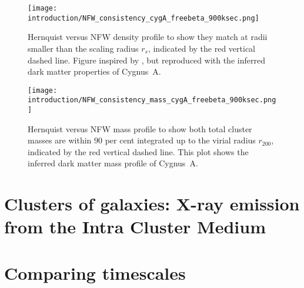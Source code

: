 \documentclass[MScProj_TLRH_ClusterEnergy.tex]{subfiles}
\begin{document}
\begin{figure}
    \centering
    \texttt{[image: introduction/NFW\_consistency\_cygA\_freebeta\_900ksec.png]}
    \caption{Hernquist versus NFW density profile to show they match at radii 
             smaller than the scaling radius $r_s$, indicated by the red vertical
             dashed line. Figure inspired by \citet{2005MNRAS.361..776S}, but reproduced
             with the inferred dark matter properties of Cygnus~A.}
    \label{fig:Hernquist_NFW_equal}
    \texttt{[image: introduction/NFW\_consistency\_mass\_cygA\_freebeta\_900ksec.png]}
    \caption{Hernquist versus NFW mass profile to show both total cluster
             masses are within $90$ per cent integrated up to the virial
             radius $r_{200}$, indicated by the red vertical dashed line. This
             plot shows the inferred dark matter mass profile of Cygnus~A.}
    \label{fig:Hernquist_NFW_equal_mass}
\end{figure}




\section{Clusters of galaxies: X-ray emission from the Intra Cluster Medium}
\label{sec:clustergas}

\section*{Comparing timescales}

% 
\end{document}
